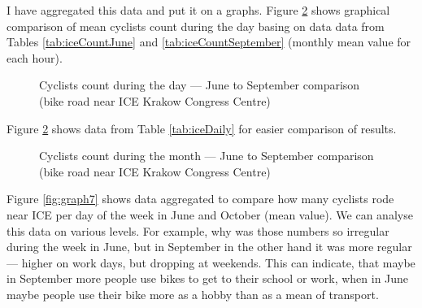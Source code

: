 I have aggregated this data and put it on a graphs. Figure \ref{fig:graph2} shows graphical comparison of mean cyclists count during the day basing on data data from Tables \ref{tab:iceCountJune} and \ref{tab:iceCountSeptember} (monthly mean value for each hour).
\begin{figure}[H]
    \centering
    \caption{Cyclists count during the day --- June to September comparison (bike road near ICE Krakow Congress Centre)}
    \label{fig:graph4}
\end{figure}
Figure \ref{fig:graph2} shows data from Table \ref{tab:iceDaily} for easier comparison of results.
\begin{figure}[H]
    \centering
    \caption{Cyclists count during the month --- June to September comparison (bike road near ICE Krakow Congress Centre)}
    \label{fig:graph2}
\end{figure}
Figure \ref{fig:graph7} shows data aggregated to compare how many cyclists rode near ICE per day of the week in June and October (mean value). We can analyse this data on various levels. For example, why was those numbers so irregular during the week in June, but in September in the other hand it was more regular --- higher on work days, but dropping at weekends. This can indicate, that maybe in September more people use bikes to get to their school or work, when in June maybe people use their bike more as a hobby than as a mean of transport. 
